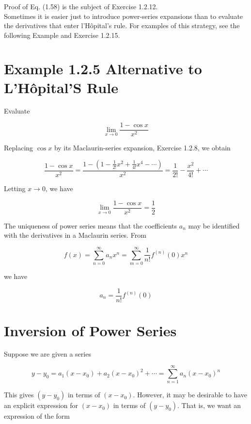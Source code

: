 \documentclass[10pt]{article}
\begin{document}
Proof of Eq. (1.58) is the subject of Exercise 1.2.12.\\
Sometimes it is easier just to introduce power-series expansions than to evaluate the derivatives that enter l'Hôpital's rule. For examples of this strategy, see the following Example and Exercise 1.2.15.

\section*{Example 1.2.5 Alternative to L'Hôpital'S Rule}
Evaluate


\begin{equation*}
\lim _{x \rightarrow 0} \frac{1-\cos x}{x^{2}} \tag{1.59}
\end{equation*}


Replacing $\cos x$ by its Maclaurin-series expansion, Exercise 1.2.8, we obtain

$$
\frac{1-\cos x}{x^{2}}=\frac{1-\left(1-\frac{1}{2!} x^{2}+\frac{1}{4!} x^{4}-\cdots\right)}{x^{2}}=\frac{1}{2!}-\frac{x^{2}}{4!}+\cdots
$$

Letting $x \rightarrow 0$, we have


\begin{equation*}
\lim _{x \rightarrow 0} \frac{1-\cos x}{x^{2}}=\frac{1}{2} \tag{1.60}
\end{equation*}


The uniqueness of power series means that the coefficients $a_{n}$ may be identified with the derivatives in a Maclaurin series. From

$$
f(x)=\sum_{n=0}^{\infty} a_{n} x^{n}=\sum_{m=0}^{\infty} \frac{1}{n!} f^{(n)}(0) x^{n}
$$

we have

$$
a_{n}=\frac{1}{n!} f^{(n)}(0)
$$

\section*{Inversion of Power Series}
Suppose we are given a series


\begin{equation*}
y-y_{0}=a_{1}\left(x-x_{0}\right)+a_{2}\left(x-x_{0}\right)^{2}+\cdots=\sum_{n=1}^{\infty} a_{n}\left(x-x_{0}\right)^{n} \tag{1.61}
\end{equation*}


This gives $\left(y-y_{0}\right)$ in terms of $\left(x-x_{0}\right)$. However, it may be desirable to have an explicit expression for $\left(x-x_{0}\right)$ in terms of $\left(y-y_{0}\right)$. That is, we want an expression of the form
\end{document}
